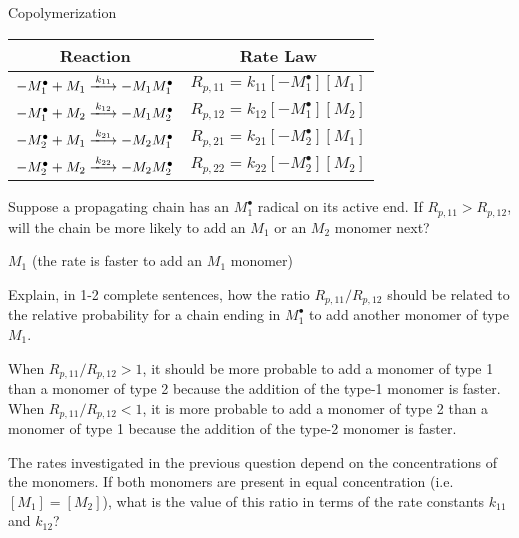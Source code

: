 \begin{activity}{Copolymerization}
\begin{model}
	\begin{center}
		\renewcommand{\arraystretch}{1.8}
		\begin{tabular}{|c|c|}
			\hline
			\textbf{Reaction} & \textbf{Rate Law} \\\hline
			$-M_1^\bullet + M_1 \xlongrightarrow{k_{11}} -M_1M_1^\bullet$ & $R_{p,11} = k_{11}[-M_1^\bullet][M_1]$ \\\hline
			$-M_1^\bullet + M_2 \xlongrightarrow{k_{12}} -M_1M_2^\bullet$ & $R_{p,12} = k_{12}[-M_1^\bullet][M_2]$ \\\hline
			$-M_2^\bullet + M_1 \xlongrightarrow{k_{21}} -M_2M_1^\bullet$ & $R_{p,21} = k_{21}[-M_2^\bullet][M_1]$ \\\hline
			$-M_2^\bullet + M_2 \xlongrightarrow{k_{22}} -M_2M_2^\bullet$ & $R_{p,22} = k_{22}[-M_2^\bullet][M_2]$ \\\hline
		\end{tabular}
	\end{center}

\end{model}

\begin{ctqs}

	\question Suppose a propagating chain has an $M_1^\bullet$ radical on its active end.  If $R_{p,11}>R_{p,12}$, will the chain be more likely to add an $M_1$ or an $M_2$ monomer next?
	
		\begin{solution}[0.5in]{}
			$M_1$ (the rate is faster to add an $M_1$ monomer)
		\end{solution}
	
	\question Explain, in 1-2 complete sentences, how the ratio $R_{p,11}/R_{p,12}$ should be related to the relative probability for a chain ending in $M_1^\bullet$ to add another monomer of type $M_1$.
	
		\begin{solution}[1in]{}
			When $R_{p,11}/R_{p,12} > 1$, it should be more probable to add a monomer of type 1 than a monomer of type 2 because the addition of the type-1 monomer is faster.  When $R_{p,11}/R_{p,12}< 1$, it is more probable to add a monomer of type 2 than a monomer of type 1 because the addition of the type-2 monomer is faster.
		\end{solution}
	
	\question The rates investigated in the previous question depend on the concentrations of the monomers.  If both monomers are present in equal concentration (i.e. $[M_1]=[M_2]$), what is the value of this ratio in terms of the rate constants $k_{11}$ and $k_{12}$?
	

\end{ctqs}
\end{activity}
